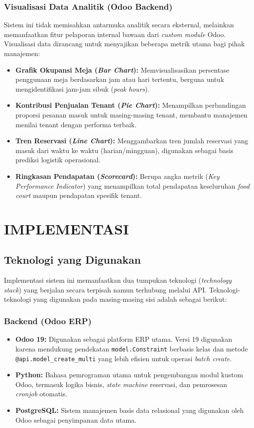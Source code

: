\documentclass[conference]{IEEEtran}
\begin{document}
\subsubsection{Visualisasi Data Analitik (Odoo Backend)}
Sistem ini tidak memisahkan antarmuka analitik secara eksternal, melainkan memanfaatkan fitur pelaporan internal bawaan dari \textit{custom module} Odoo. Visualisasi data dirancang untuk menyajikan beberapa metrik utama bagi pihak manajemen:
\begin{itemize}
    \item \textbf{Grafik Okupansi Meja (\textit{Bar Chart}):} Memvisualisasikan persentase penggunaan meja berdasarkan jam atau hari tertentu, berguna untuk mengidentifikasi jam-jam sibuk (\textit{peak hours}).
    \item \textbf{Kontribusi Penjualan Tenant (\textit{Pie Chart}):} Menampilkan perbandingan proporsi pesanan masuk untuk masing-masing tenant, membantu manajemen menilai tenant dengan performa terbaik.
    \item \textbf{Tren Reservasi (\textit{Line Chart}):} Menggambarkan tren jumlah reservasi yang masuk dari waktu ke waktu (harian/mingguan), digunakan sebagai basis prediksi logistik operasional.
    \item \textbf{Ringkasan Pendapatan (\textit{Scorecard}):} Berupa angka metrik (\textit{Key Performance Indicator}) yang menampilkan total pendapatan keseluruhan \textit{food court} maupun pendapatan spesifik tenant.
\end{itemize}
\section{IMPLEMENTASI}

\subsection{Teknologi yang Digunakan}
Implementasi sistem ini memanfaatkan dua tumpukan teknologi (\textit{technology stack}) yang berjalan secara terpisah namun terhubung melalui API. Teknologi-teknologi yang digunakan pada masing-masing sisi adalah sebagai berikut:

\subsubsection{Backend (Odoo ERP)}
\begin{itemize}
    \item \textbf{Odoo 19:} Digunakan sebagai platform ERP utama. Versi 19 digunakan karena mendukung pendekatan \texttt{model.Constraint} berbasis kelas dan metode \texttt{@api.model\_create\_multi} yang lebih efisien untuk operasi \textit{batch create}.
    \item \textbf{Python:} Bahasa pemrograman utama untuk pengembangan modul kustom Odoo, termasuk logika bisnis, \textit{state machine} reservasi, dan pemrosesan \textit{cronjob} otomatis.
    \item \textbf{PostgreSQL:} Sistem manajemen basis data relasional yang digunakan oleh Odoo sebagai penyimpanan data utama.
\end{itemize}
\end{document}
